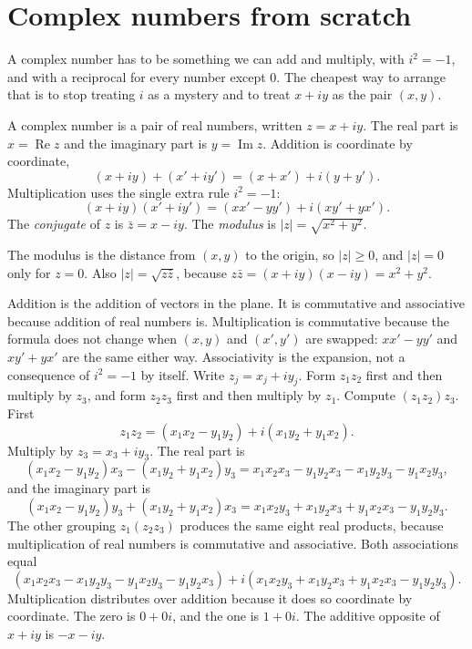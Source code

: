 
\section{Complex numbers from scratch}

A complex number has to be something we can add and multiply, with $i^2=-1$, and with a reciprocal for every number except $0$. The cheapest way to arrange that is to stop treating $i$ as a mystery and to treat $x+iy$ as the pair $(x,y)$.

\begin{definitionx}
A complex number is a pair of real numbers, written $z=x+iy$. The real part is $x=\operatorname{Re}z$ and the imaginary part is $y=\operatorname{Im}z$. Addition is coordinate by coordinate,
\[
(x+iy)+(x'+iy')=(x+x')+i(y+y').
\]
Multiplication uses the single extra rule $i^2=-1$:
\[
(x+iy)(x'+iy')=(xx'-yy')+i(xy'+yx').
\]
The \emph{conjugate} of $z$ is $\bar z=x-iy$. The \emph{modulus} is $|z|=\sqrt{x^2+y^2}$.
\end{definitionx}

The modulus is the distance from $(x,y)$ to the origin, so $|z|\ge0$, and $|z|=0$ only for $z=0$. Also $|z|=\sqrt{z\bar z}$, because $z\bar z=(x+iy)(x-iy)=x^2+y^2$.

Addition is the addition of vectors in the plane. It is commutative and associative because addition of real numbers is. Multiplication is commutative because the formula does not change when $(x,y)$ and $(x',y')$ are swapped: $xx'-yy'$ and $xy'+yx'$ are the same either way. Associativity is the expansion, not a consequence of $i^2=-1$ by itself. Write $z_j=x_j+iy_j$. Form $z_1z_2$ first and then multiply by $z_3$, and form $z_2z_3$ first and then multiply by $z_1$. Compute $(z_1z_2)z_3$. First
\[
z_1z_2=(x_1x_2-y_1y_2)+i(x_1y_2+y_1x_2).
\]
Multiply by $z_3=x_3+iy_3$. The real part is
\[
(x_1x_2-y_1y_2)x_3-(x_1y_2+y_1x_2)y_3=x_1x_2x_3-y_1y_2x_3-x_1y_2y_3-y_1x_2y_3,
\]
and the imaginary part is
\[
(x_1x_2-y_1y_2)y_3+(x_1y_2+y_1x_2)x_3=x_1x_2y_3+x_1y_2x_3+y_1x_2x_3-y_1y_2y_3.
\]
The other grouping $z_1(z_2z_3)$ produces the same eight real products, because multiplication of real numbers is commutative and associative. Both associations equal
\[
(x_1x_2x_3-x_1y_2y_3-y_1x_2y_3-y_1y_2x_3)+i(x_1x_2y_3+x_1y_2x_3+y_1x_2x_3-y_1y_2y_3).
\] Multiplication distributes over addition because it does so coordinate by coordinate. The zero is $0+0i$, and the one is $1+0i$. The additive opposite of $x+iy$ is $-x-iy$.

